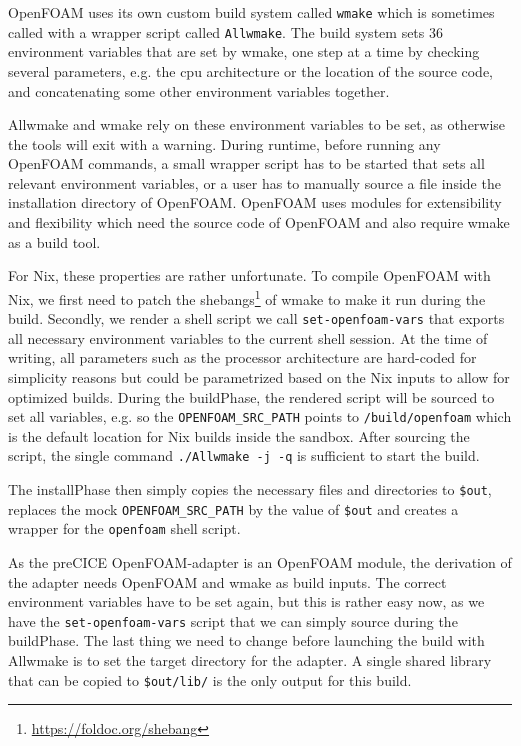 \documentclass[conference,final,a4paper]{IEEEtran}
\begin{document}
OpenFOAM uses its own custom build system called \texttt{wmake} which is sometimes called with a wrapper script called \texttt{Allwmake}.
The build system sets 36 environment variables that are set by wmake, one step at a time by checking several parameters, e.g. the cpu architecture or the location of the source code, and concatenating some other environment variables together.

Allwmake and wmake rely on these environment variables to be set, as otherwise the tools will exit with a warning.
During runtime, before running any OpenFOAM commands, a small wrapper script has to be started that sets all relevant environment variables, or a user has to manually source a file inside the installation directory of OpenFOAM.
OpenFOAM uses modules for extensibility and flexibility which need the source code of OpenFOAM and also require wmake as a build tool.

For Nix, these properties are rather unfortunate.
To compile OpenFOAM with Nix, we first need to patch the shebangs\footnote{\url{https://foldoc.org/shebang}} of wmake to make it run during the build.
Secondly, we render a shell script we call \texttt{set-openfoam-vars} that exports all necessary environment variables to the current shell session.
At the time of writing, all parameters such as the processor architecture are hard-coded for simplicity reasons but could be parametrized based on the Nix inputs to allow for optimized builds.
During the buildPhase, the rendered script will be sourced to set all variables, e.g. so the \texttt{OPENFOAM\_SRC\_PATH} points to \texttt{/build/openfoam} which is the default location for Nix builds inside the sandbox.
After sourcing the script, the single command \texttt{./Allwmake -j -q} is sufficient to start the build.

The installPhase then simply copies the necessary files and directories to \texttt{\$out}, replaces the mock \texttt{OPENFOAM\_SRC\_PATH} by the value of \texttt{\$out} and creates a wrapper for the \texttt{openfoam} shell script.

As the preCICE OpenFOAM-adapter is an OpenFOAM module, the derivation of the adapter needs OpenFOAM and wmake as build inputs.
The correct environment variables have to be set again, but this is rather easy now, as we have the \texttt{set-openfoam-vars} script that we can simply source during the buildPhase.
The last thing we need to change before launching the build with Allwmake is to set the target directory for the adapter.
A single shared library that can be copied to \texttt{\$out/lib/} is the only output for this build.
\end{document}
